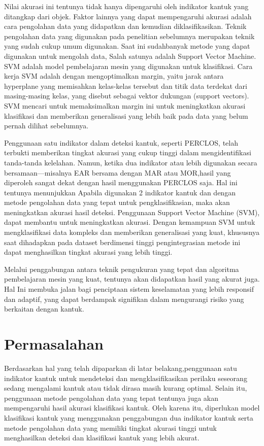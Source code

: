 Nilai akurasi ini tentunya tidak hanya dipengaruhi oleh indikator kantuk yang ditangkap dari objek. Faktor lainnya yang dapat mempengaruhi akurasi adalah cara pengolahan data yang didapatkan dan kemudian diklasifikasikan. Teknik pengolahan data yang digunakan pada penelitian sebelumnya merupakan teknik yang sudah cukup umum digunakan. Saat ini sudahbanyak metode yang dapat digunakan untuk mengolah data, Salah satunya adalah Support Vector Machine. SVM adalah model pembelajaran mesin yang digunakan untuk klasifikasi. Cara kerja SVM adalah dengan mengoptimalkan margin, yaitu jarak antara hyperplane yang memisahkan kelas-kelas tersebut dan titik data terdekat dari masing-masing kelas, yang disebut sebagai vektor dukungan (support vectors). SVM mencari untuk memaksimalkan margin ini untuk meningkatkan akurasi klasifikasi dan memberikan generalisasi yang lebih baik pada data yang belum pernah dilihat sebelumnya. 

Penggunaan satu indikator dalam deteksi kantuk, seperti PERCLOS, telah terbukti memberikan tingkat akurasi yang cukup tinggi dalam mengidentifikasi tanda-tanda kelelahan. Namun, ketika dua indikator atau lebih digunakan secara bersamaan—misalnya EAR bersama
dengan MAR atau MOR,hasil yang diperoleh sangat dekat dengan hasil menggunakan PERCLOS saja. Hal ini tentunya menunjukkan Apabila digunakan 2 indikator kantuk dan dengan metode pengolahan data yang tepat untuk pengklasifikasian, maka akan meningkatkan akurasi hasil deteksi. Penggunaan Support Vector Machine (SVM), dapat membantu untuk meningkatkan akurasi. Dengan kemampuan SVM untuk mengklasifikasi data kompleks dan memberikan generalisasi yang kuat, khususnya saat dihadapkan pada dataset berdimensi tinggi pengintegrasian metode ini dapat menghasilkan tingkat akurasi yang lebih tinggi. 

Melalui penggabungan antara teknik pengukuran yang tepat dan algoritma pembelajaran mesin yang kuat, tentunya akan didapatkan hasil yang akurat juga. Hal Ini membuka jalan bagi penciptaan sistem keselamatan yang lebih responsif dan adaptif, yang dapat berdampak signifikan dalam mengurangi risiko yang berkaitan dengan kantuk.

\section{Permasalahan}
\label{sec:permasalahan}

Berdasarkan hal yang telah dipaparkan di latar belakang,penggunaan satu indikator kantuk untuk mendeteksi dan mengklasifikasikan perilaku seseorang sedang mengalami kantuk atau tidak dirasa masih kurang optimal. Selain itu, penggunaan metode pengolahan data yang
tepat tentunya juga akan mempengaruhi hasil akurasi klasifikasi kantuk. Oleh karena itu, diperlukan model klasifikasi kantuk yang menggunakan penggabungan dua indikator kantuk serta metode pengolahan data yang memiliki tingkat akurasi tinggi untuk menghasilkan deteksi dan klasifikasi kantuk yang lebih akurat.

